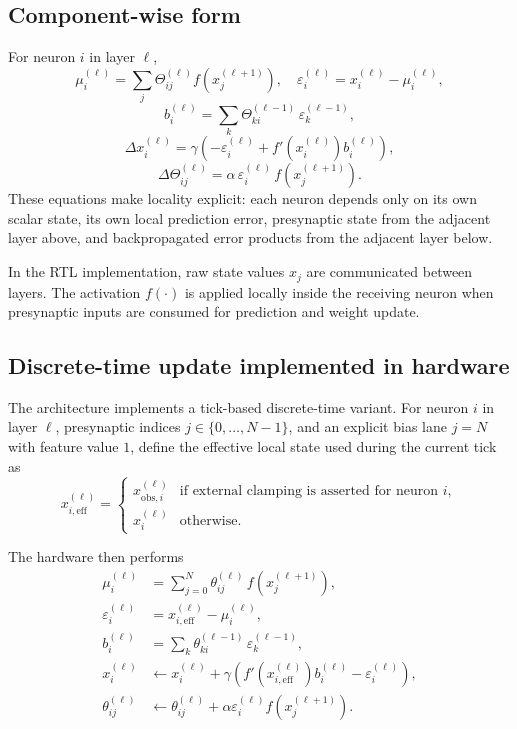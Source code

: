 \documentclass{article}
\begin{document}
\subsection{Component-wise form}
\label{sec:pc-component}

For neuron \( i \) in layer \( \ell \),
\[
\mu^{(\ell)}_i = \sum_j \Theta^{(\ell)}_{ij} f\!\left(x^{(\ell+1)}_j\right),\quad
\varepsilon^{(\ell)}_i = x^{(\ell)}_i - \mu^{(\ell)}_i,
\]
\[
b_i^{(\ell)} = \sum_k \Theta^{(\ell-1)}_{k i} \, \varepsilon^{(\ell-1)}_k,
\]
\[
\Delta x^{(\ell)}_i
= \gamma \left(
    -\varepsilon^{(\ell)}_i
    + f'\!\left(x^{(\ell)}_i\right) b_i^{(\ell)}
  \right),
\]
\[
\Delta \Theta^{(\ell)}_{ij}
= \alpha \, \varepsilon^{(\ell)}_i \, f\!\left(x^{(\ell+1)}_j\right).
\]
These equations make locality explicit: each neuron depends only on its own scalar state, its own local prediction error, presynaptic state from the adjacent layer above, and backpropagated error products from the adjacent layer below.

In the RTL implementation, raw state values \(x_j\) are communicated between layers. The activation \(f(\cdot)\) is applied locally inside the receiving neuron when presynaptic inputs are consumed for prediction and weight update.

\subsection{Discrete-time update implemented in hardware}
\label{sec:pc-discrete}

The architecture implements a tick-based discrete-time variant. For neuron \(i\) in layer \(\ell\), presynaptic indices \(j \in \{0,\dots,N-1\}\), and an explicit bias lane \(j=N\) with feature value \(1\), define the effective local state used during the current tick as
\[
x_{i,\mathrm{eff}}^{(\ell)} =
\begin{cases}
x_{\mathrm{obs},i}^{(\ell)} & \text{if external clamping is asserted for neuron } i, \\
x_i^{(\ell)} & \text{otherwise}.
\end{cases}
\]

The hardware then performs
\begin{align}
\mu_i^{(\ell)} &= \sum_{j=0}^{N} \theta_{ij}^{(\ell)} \, f\!\left(x_j^{(\ell+1)}\right), \\
\varepsilon_i^{(\ell)} &= x_{i,\mathrm{eff}}^{(\ell)} - \mu_i^{(\ell)}, \\
b_i^{(\ell)} &= \sum_k \theta_{k i}^{(\ell-1)} \, \varepsilon_k^{(\ell-1)}, \\
x_i^{(\ell)} &\leftarrow x_i^{(\ell)} + \gamma \left( f'\!\left(x_{i,\mathrm{eff}}^{(\ell)}\right) b_i^{(\ell)} - \varepsilon_i^{(\ell)} \right), \\
\theta_{ij}^{(\ell)} &\leftarrow \theta_{ij}^{(\ell)} + \alpha \varepsilon_i^{(\ell)} f\!\left(x_j^{(\ell+1)}\right).
\end{align}
\end{document}
